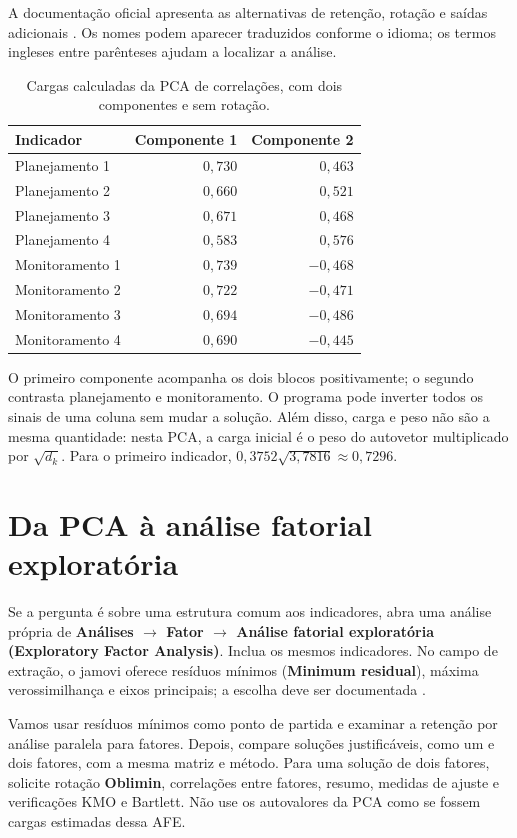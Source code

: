 A documentação oficial apresenta as alternativas de retenção, rotação e saídas adicionais \parencite{JamoviPCA}. Os nomes podem aparecer traduzidos conforme o idioma; os termos ingleses entre parênteses ajudam a localizar a análise.

\begin{table}[H]
\centering
\caption{Cargas calculadas da PCA de correlações, com dois componentes e sem rotação.}
\begin{tabular}{lrr}
\hline
Indicador & Componente 1 & Componente 2 \\
\hline
Planejamento 1 & $0{,}730$ & $0{,}463$ \\
Planejamento 2 & $0{,}660$ & $0{,}521$ \\
Planejamento 3 & $0{,}671$ & $0{,}468$ \\
Planejamento 4 & $0{,}583$ & $0{,}576$ \\
Monitoramento 1 & $0{,}739$ & $-0{,}468$ \\
Monitoramento 2 & $0{,}722$ & $-0{,}471$ \\
Monitoramento 3 & $0{,}694$ & $-0{,}486$ \\
Monitoramento 4 & $0{,}690$ & $-0{,}445$ \\
\hline
\end{tabular}
\label{tab:cargas-pca-dimensoes}
\end{table}

O primeiro componente acompanha os dois blocos positivamente; o segundo contrasta planejamento e monitoramento. O programa pode inverter todos os sinais de uma coluna sem mudar a solução. Além disso, carga e peso não são a mesma quantidade: nesta PCA, a carga inicial é o peso do autovetor multiplicado por $\sqrt{d_k}$. Para o primeiro indicador, $0{,}3752\sqrt{3{,}7816}\approx0{,}7296$.

\section{Da PCA à análise fatorial exploratória}

Se a pergunta é sobre uma estrutura comum aos indicadores, abra uma análise própria de \textbf{Análises $\rightarrow$ Fator $\rightarrow$ Análise fatorial exploratória (Exploratory Factor Analysis)}. Inclua os mesmos indicadores. No campo de extração, o jamovi oferece resíduos mínimos (\textbf{Minimum residual}), máxima verossimilhança e eixos principais; a escolha deve ser documentada \parencite{JamoviAFE}.

Vamos usar resíduos mínimos como ponto de partida e examinar a retenção por análise paralela para fatores. Depois, compare soluções justificáveis, como um e dois fatores, com a mesma matriz e método. Para uma solução de dois fatores, solicite rotação \textbf{Oblimin}, correlações entre fatores, resumo, medidas de ajuste e verificações KMO e Bartlett. Não use os autovalores da PCA como se fossem cargas estimadas dessa AFE.

